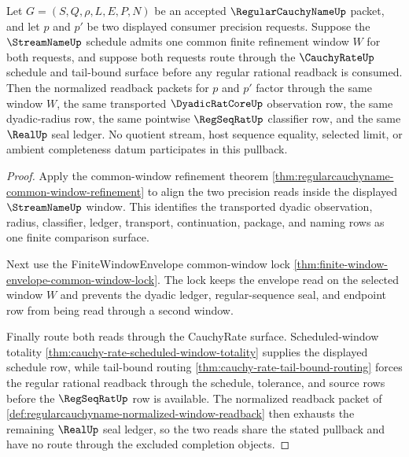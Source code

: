 \begin{theorem}
\label{thm:regularcauchyname-synchronized-precision-pullback}
Let $G=(S,Q,\rho,L,E,P,N)$ be an accepted $\RegularCauchyNameUp$ packet, and let $p$ and $p'$ be two displayed consumer precision requests. Suppose the $\StreamNameUp$ schedule admits one common finite refinement window $W$ for both requests, and suppose both requests route through the $\CauchyRateUp$ schedule and tail-bound surface before any regular rational readback is consumed. Then the normalized readback packets for $p$ and $p'$ factor through the same window $W$, the same transported $\DyadicRatCoreUp$ observation row, the same dyadic-radius row, the same pointwise $\RegSeqRatUp$ classifier row, and the same $\RealUp$ seal ledger. No quotient stream, host sequence equality, selected limit, or ambient completeness datum participates in this pullback.
\end{theorem}
\begin{proof}
Apply the common-window refinement theorem \autoref{thm:regularcauchyname-common-window-refinement} to align the two precision reads inside the displayed $\StreamNameUp$ window. This identifies the transported dyadic observation, radius, classifier, ledger, transport, continuation, package, and naming rows as one finite comparison surface.

Next use the FiniteWindowEnvelope common-window lock \autoref{thm:finite-window-envelope-common-window-lock}. The lock keeps the envelope read on the selected window $W$ and prevents the dyadic ledger, regular-sequence seal, and endpoint row from being read through a second window.

Finally route both reads through the CauchyRate surface. Scheduled-window totality \autoref{thm:cauchy-rate-scheduled-window-totality} supplies the displayed schedule row, while tail-bound routing \autoref{thm:cauchy-rate-tail-bound-routing} forces the regular rational readback through the schedule, tolerance, and source rows before the $\RegSeqRatUp$ row is available. The normalized readback packet of \autoref{def:regularcauchyname-normalized-window-readback} then exhausts the remaining $\RealUp$ seal ledger, so the two reads share the stated pullback and have no route through the excluded completion objects.
\end{proof}

